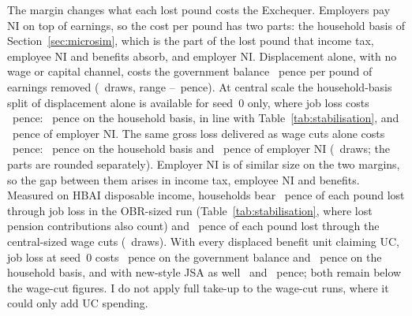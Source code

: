 The margin changes what each lost pound costs the Exchequer. Employers pay NI on top of earnings, so the cost per pound has two parts: the household basis of Section~\ref{sec:microsim}, which is the part of the lost pound that income tax, employee NI and benefits absorb, and employer NI. Displacement alone, with no wage or capital channel, costs the government balance \genAbsJobGovDrawsPct~pence per pound of earnings removed (\genWcDraws~draws, range \genAbsJobGovDrawsMinPct--\genAbsJobGovDrawsMaxPct~pence). At central scale the household-basis split of displacement alone is available for seed~0 only, where job loss costs \genAbsJobGovPct~pence: \genAbsJobHhPct~pence on the household basis, in line with Table~\ref{tab:stabilisation}, and \genAbsJobRestPct~pence of employer NI. The same gross loss delivered as wage cuts alone costs \genAbsCutGovPct~pence: \genAbsCutHhPct~pence on the household basis and \genAbsCutErNiPct~pence of employer NI (\genWcDraws~draws; the parts are rounded separately). Employer NI is of similar size on the two margins, so the gap between them arises in income tax, employee NI and benefits. Measured on HBAI disposable income, households bear \genObrHhBearPct~pence of each pound lost through job loss in the OBR-sized run (Table~\ref{tab:stabilisation}, where lost pension contributions also count) and \genWcCutOnlyHhBearPct~pence of each pound lost through the central-sized wage cuts (\genWcDraws~draws). With every displaced benefit unit claiming UC, job loss at seed~0 costs \genAbsJobGovTakeupPct~pence on the government balance and \genAbsJobHhTakeupPct~pence on the household basis, and with new-style JSA as well \genAbsJobGovJsaPct~and \genAbsJobHhJsaPct~pence; both remain below the wage-cut figures. I do not apply full take-up to the wage-cut runs, where it could only add UC spending.

